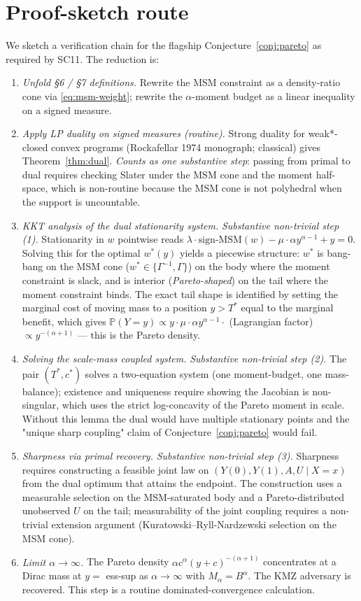 \documentclass[11pt]{article}
\renewcommand{\Pr}{\mathbb{P}}
\theoremstyle{definition}
\theoremstyle{plain}
\theoremstyle{remark}
\begin{document}
\section{Proof-sketch route}

We sketch a verification chain for the flagship Conjecture~\ref{conj:pareto} as required by SC11. The reduction is:
\begin{enumerate}[leftmargin=2em, label=\textbf{Step \arabic*.}]
  \item \emph{Unfold \S6 / \S7 definitions.} Rewrite the MSM constraint as a density-ratio cone via \eqref{eq:msm-weight}; rewrite the $\alpha$-moment budget as a linear inequality on a signed measure.
  \item \emph{Apply LP duality on signed measures (routine).} Strong duality for weak*-closed convex programs (Rockafellar 1974 monograph; classical) gives Theorem~\ref{thm:dual}. \emph{Counts as one substantive step}: passing from primal to dual requires checking Slater under the MSM cone and the moment half-space, which is non-routine because the MSM cone is not polyhedral when the support is uncountable.
  \item \emph{KKT analysis of the dual stationarity system.} \emph{Substantive non-trivial step (1).} Stationarity in $w$ pointwise reads $\lambda\cdot \mathrm{sign\text{-}MSM}(w) - \mu\cdot \alpha y^{\alpha-1} + y = 0$. Solving this for the optimal $w^\ast(y)$ yields a piecewise structure: $w^\ast$ is bang-bang on the MSM cone ($w^\ast \in\{\Gamma^{-1}, \Gamma\}$) on the body where the moment constraint is slack, and is interior (\emph{Pareto-shaped}) on the tail where the moment constraint binds. The exact tail shape is identified by setting the marginal cost of moving mass to a position $y > T^\ast$ equal to the marginal benefit, which gives $\Pr(Y=y)\propto y\cdot \mu\cdot\alpha y^{\alpha-1}\cdot$ (Lagrangian factor) $\propto y^{-(\alpha+1)}$ --- this is the Pareto density.
  \item \emph{Solving the scale-mass coupled system.} \emph{Substantive non-trivial step (2).} The pair $(T^\ast, c^\ast)$ solves a two-equation system (one moment-budget, one mass-balance); existence and uniqueness require showing the Jacobian is non-singular, which uses the strict log-concavity of the Pareto moment in scale. Without this lemma the dual would have multiple stationary points and the "unique sharp coupling" claim of Conjecture~\ref{conj:pareto} would fail.
  \item \emph{Sharpness via primal recovery.} \emph{Substantive non-trivial step (3).} Sharpness requires constructing a feasible joint law on $(Y(0), Y(1), A, U\mid X=x)$ from the dual optimum that attains the endpoint. The construction uses a measurable selection on the MSM-saturated body and a Pareto-distributed unobserved $U$ on the tail; measurability of the joint coupling requires a non-trivial extension argument (Kuratowski--Ryll-Nardzewski selection on the MSM cone).
  \item \emph{Limit $\alpha\to\infty$.} The Pareto density $\alpha c^\alpha (y+c)^{-(\alpha+1)}$ concentrates at a Dirac mass at $y = $ ess-sup as $\alpha\to\infty$ with $M_\alpha = B^\alpha$. The KMZ adversary is recovered. This step is a routine dominated-convergence calculation.
\end{enumerate}
\end{document}

